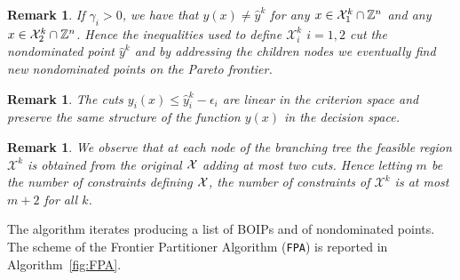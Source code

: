 \documentclass[preprint,12pt]{elsarticle}
\newtheorem{remark}[theorem]{Remark}
\def\X{{\cal X}}
\def\Z{\mathbb{Z}}
\begin{document}
%
\begin{remark}\label{rem:const}
 If $\gamma_i>0$, we have that $y(x)\neq \hat y^k$  for any $x\in \X^k_{1}\cap \Z^n$ and any $x\in \X^k_2\cap \Z^n$.
 Hence the inequalities used to define  $\mathcal{X}^k_i$ $i=1,2$  cut the nondominated point $\hat y^k$ and
 by addressing the children nodes we eventually find new nondominated points on the Pareto frontier.
\end{remark}
%

\begin{remark}\label{rem:cuts}
The cuts $ y_i(x)\leq \hat y^k_i - \epsilon_i$ are linear in the criterion space and preserve the same structure of the function $y(x)$ in the decision space.
\end{remark}


\begin{remark}\label{rem:number_cuts}
We observe that at each node of the branching tree the feasible region $\mathcal{X}^k$
is obtained from the original $\cal X$ adding at most two cuts. Hence letting $m$ be the number of constraints defining $\cal X$, the number of constraints of $\mathcal{X}^k$ is at most $m+2$ for all $k$.
\end{remark}

The algorithm iterates producing a list of BOIPs and of nondominated points.
The scheme of the Frontier Partitioner Algorithm (\texttt{FPA}) is reported in Algorithm~\ref{fig:FPA}.
\end{document}
